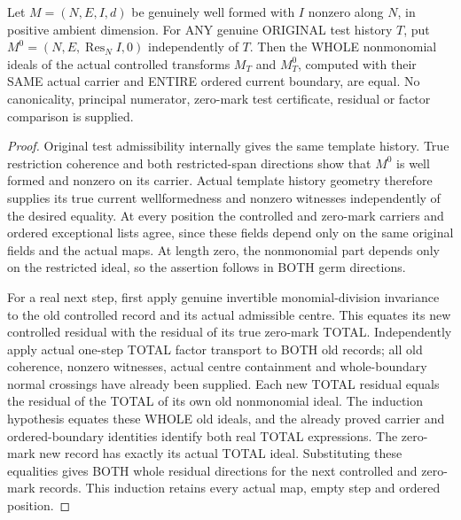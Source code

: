\begin{lemma}
\label{hir:original-general-controlled-zero-history-whole-residual}
\leanok
Let $M=(N,E,I,d)$ be genuinely well formed with $I$ nonzero along $N$,
in positive ambient dimension. For ANY genuine ORIGINAL test history $T$,
put $M^0=(N,E,\operatorname{Res}_N I,0)$ independently of $T$.
Then the WHOLE nonmonomial ideals of the actual controlled transforms
$M_T$ and $M^0_T$, computed with their SAME actual carrier and ENTIRE
ordered current boundary, are equal. No canonicality, principal numerator,
zero-mark test certificate, residual or factor comparison is supplied.
\end{lemma}
\begin{proof}
Original test admissibility internally gives the same template history.
True restriction coherence and both restricted-span directions show that
$M^0$ is well formed and nonzero on its carrier. Actual template history
geometry therefore supplies its true current wellformedness and nonzero
witnesses independently of the desired equality. At every position the
controlled and zero-mark carriers and ordered exceptional lists agree,
since these fields depend only on the same original fields and the
actual maps. At length zero, the nonmonomial part depends only on the
restricted ideal, so the assertion follows in BOTH germ directions.

For a real next step, first apply genuine invertible monomial-division
invariance to the old controlled record and its actual admissible centre.
This equates its new controlled residual with the residual of its true
zero-mark TOTAL. Independently apply actual one-step TOTAL factor transport
to BOTH old records; all old coherence, nonzero witnesses, actual centre
containment and whole-boundary normal crossings have already been supplied.
Each new TOTAL residual equals the residual of the TOTAL of its own old
nonmonomial ideal. The induction hypothesis equates these WHOLE old
ideals, and the already proved carrier and ordered-boundary identities
identify both real TOTAL expressions. The zero-mark new record has exactly
its actual TOTAL ideal. Substituting these equalities gives BOTH whole
residual directions for the next controlled and zero-mark records.
This induction retains every actual map, empty step and ordered position.
\end{proof}

